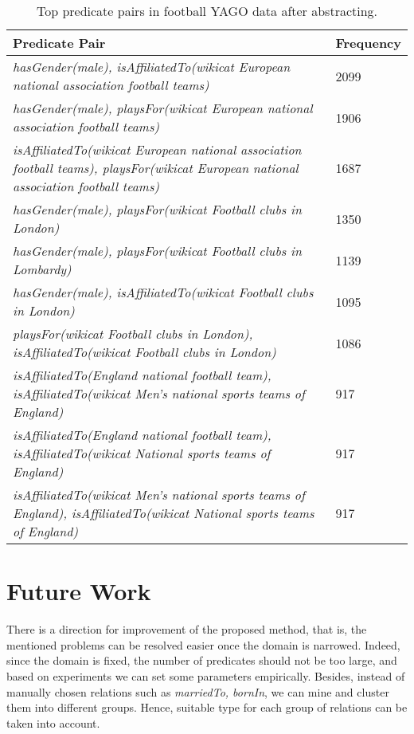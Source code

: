 \documentclass{acm_proc_article-sp}
\begin{document}
\begin{table}[ht]
\caption{Top predicate pairs in football YAGO data after abstracting.}
\label{table6}
\begin{center}
\begin{tabular}{ |p{6cm}|p{1.5cm}| } 
\hline
Predicate Pair & Frequency\\
\hline
\textit{hasGender(male), isAffiliatedTo(wikicat European national association football teams)} & 2099 \\
\hline
\textit{hasGender(male), playsFor(wikicat European national association football teams)} & 1906 \\
\hline
\textit{isAffiliatedTo(wikicat European national association football teams), playsFor(wikicat European national association football teams)} & 1687 \\
\hline
\textit{hasGender(male), playsFor(wikicat Football clubs in London)} & 1350 \\
\hline
\textit{hasGender(male), playsFor(wikicat Football clubs in Lombardy)} & 1139 \\
\hline
\textit{hasGender(male), isAffiliatedTo(wikicat Football clubs in London)} & 1095 \\
\hline
\textit{playsFor(wikicat Football clubs in London), isAffiliatedTo(wikicat Football clubs in London)} & 1086 \\
\hline
\textit{isAffiliatedTo(England national football team), isAffiliatedTo(wikicat Men's national sports teams of England)} & 917 \\
\hline
\textit{isAffiliatedTo(England national football team), isAffiliatedTo(wikicat National sports teams of England)} & 917 \\
\hline
\textit{isAffiliatedTo(wikicat Men's national sports teams of England), isAffiliatedTo(wikicat National sports teams of England)} & 917 \\
\hline
\end{tabular}
\end{center}
\end{table}

\section{Future Work}
\label{section4}

There is a direction for improvement of the proposed method, that is, the mentioned problems can be resolved easier once the domain is narrowed. Indeed, since the domain is fixed, the number of predicates should not be too large, and based on experiments we can set some parameters empirically. Besides, instead of manually chosen relations such as \textit{marriedTo, bornIn}, we can mine and cluster them into different groups. Hence, suitable type for each group of relations can be taken into account.



\end{document}

